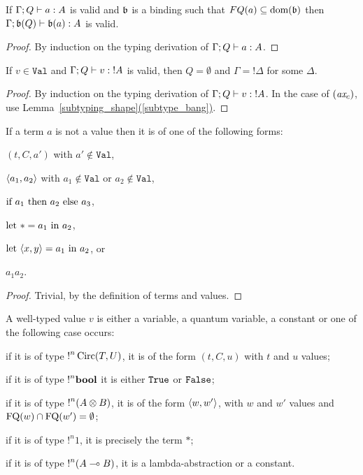 \documentclass[twoside]{article}
\begin{document}
\begin{lemma}
\label{binding_judgement}
If $\Gamma;Q \vdash a:A$ is valid and $\mathfrak{b}$ is a 
binding such that $FQ(a)\subseteq\mathop{\textrm{\rm dom}}\nolimits(\mathfrak{b})$ 
then $\Gamma;\mathfrak{b} (Q) \vdash \mathfrak{b}(a):A$ is valid.
\end{lemma}

\begin{proof}
By induction on the typing derivation of $\Gamma;Q \vdash a:A$.
\end{proof}

\begin{lemma}
\label{context_value}
If $v\in\mathtt{Val}$ and $\Gamma;Q \vdash v:{!}A$ is valid, 
then $Q=\emptyset$ and $\Gamma={!}\Delta$ for some $\Delta$.
\end{lemma}

\begin{proof}
By induction on the typing derivation of $\Gamma;Q \vdash v:{!}A$. 
In the case of $(\textit{ax}_c)$, use Lemma~\hyperref[subtype_bang]{\ref*{subtyping_shape}(\ref*{subtype_bang})}.
\end{proof}

\begin{lemma}
\label{non_values}
If a term $a$ is not a value then it is of one 
of the following forms: 
\begin{compactitemize}
\item $(t,C,a')$ with $a'\notin \mathtt{Val}$, 
\item $\langle a_1,a_2\rangle$ with $a_1\notin \mathtt{Val}$ or $a_2\notin
  \mathtt{Val}$, 
\item $\textrm{\rm if}~ a_1 ~\textrm{\rm then}~ a_2 ~\textrm{\rm else}~ a_3$,
\item $\textrm{\rm let}~ * = a_1 ~\textrm{\rm in}~ a_2$,
\item $\textrm{\rm let}~ \langle x,y\rangle = a_1 ~\textrm{\rm in}~ a_2$, or
\item $a_1a_2$.
\end{compactitemize}
\end{lemma}

\begin{proof}
Trivial, by the definition of terms and values.
\end{proof}

\begin{lemma}
\label{form_values}
A well-typed value $v$ is either a variable, a quantum variable, a constant or one 
of the following case occurs: 
\begin{compactitemize}
\item if it is of type ${!}^n\mathop{\textrm{Circ}}\nolimits(T,U)$, it is of the 
form $(t,C,u)$ with $t$ and $u$ values; 
\item if it is of type ${!}^n\textrm{\bf bool}$ it is either 
$\texttt{True}$ or $\texttt{False}$; 
\item if it is of type ${!}^n (A\otimes B)$, it is of the
form $\langle w,w'\rangle$, with $w$ and $w'$ values and $\mathop{\textrm{FQ}}\nolimits(w)\cap\mathop{\textrm{FQ}}\nolimits(w')=\emptyset$; 
\item if it is of type ${!}^n1$, it is 
precisely the term $*$; 
\item if it is of type ${!}^n (A\multimap B)$, it is a 
lambda-abstraction or a constant.
\end{compactitemize}
\end{lemma}
\end{document}
